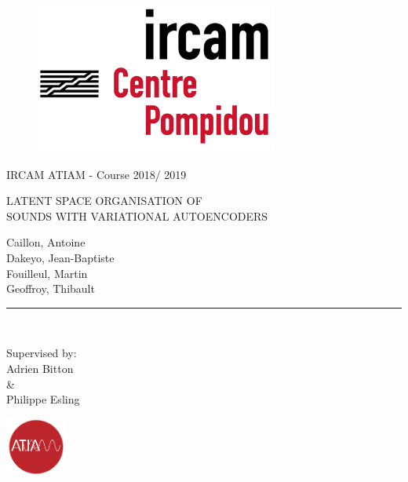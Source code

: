 \documentclass[11pt, english]{article}
\makeatletter
\gdef\@date{ Course 2018/ 2019}
\makeatother
\begin{document}
\begin{titlepage}

\begin{center}
\vspace*{2in}
\vspace*{-1in}
\begin{figure}[htb]
\begin{center}
\includegraphics[width=8cm]{img/logo_ircam.png}
\end{center}
\end{figure}

IRCAM ATIAM - \@date\\

\vspace*{0.4in}
\begin{large}
LATENT SPACE ORGANISATION OF \\
SOUNDS WITH VARIATIONAL AUTOENCODERS\\
\end{large}

\vspace*{0.3in}
\begin{large}
Caillon, Antoine \\
Dakeyo, Jean-Baptiste \\
Fouilleul, Martin \\
Geoffroy, Thibault \\
\end{large}
\vspace*{0.3in}
\rule{80mm}{0.1mm}\\
\vspace*{0.1in}
\begin{large}
Supervised by: \\
Adrien Bitton \\
\& \\
Philippe Esling \\
\end{large}
\vspace*{0.3in}
\includegraphics[width=2cm]{img/atiam.png}
\end{center}
\end{titlepage}
\end{document}
